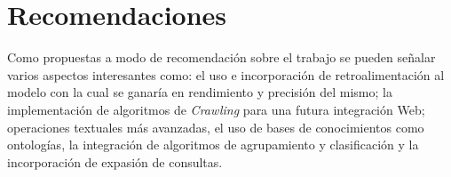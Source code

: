 \section{Recomendaciones}\label{sec:rec}

Como propuestas a modo de recomendación sobre el trabajo se pueden señalar
varios aspectos interesantes como: el uso e incorporación de retroalimentación
al modelo con la cual se ganaría en rendimiento y precisión del mismo; la
implementación de algoritmos de \emph{Crawling} para una futura integración
Web; operaciones textuales más avanzadas, el uso de bases de conocimientos
como ontologías, la integración de algoritmos de agrupamiento y clasificación
y la incorporación de expasión de consultas.
